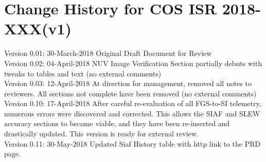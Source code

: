 \documentclass{stsci_report}
\newcommand{\thisISR}{COS ISR 2018-XXX(v1)}
\begin{document}
\section{Change History for \thisISR}\label{sec:History}
Version 0.01: 30-March-2018 Original Draft Document for Review \\
Version 0.02: 04-April-2018 NUV Image Verification Section partially debuts with tweaks to tables and text (no external comments) \\
Version 0.03: 12-April-2018 At direction for management, removed all notes to reviewers. All sections not complete have been removed (no external comments)\\
Version 0.10: 17-April-2018 After careful re-evaluation of all FGS-to-SI telemetry, numerous errors were discovered and corrected. This allows the SIAF and SLEW accuracy sections to become viable, and they have been re-inserted and drastically updated. This version is ready for external review.\\
Version 0.11: 30-May-2018 Updated Siaf History table with http link to the PRD page.\\
\end{document}
